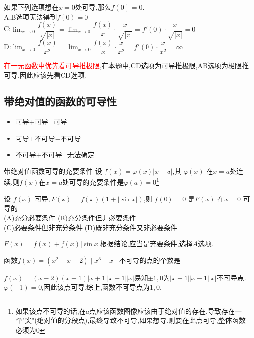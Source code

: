 \documentclass[8pt a4paper, oneside, UTF8]{ctexbook}  %
\begin{document}
\begin{sloppypar}
\begin{solution}
        如果下列选项想在$x=0$处可导,那么$f(0)=0$.\\
        A,B选项无法得到$f(0)=0$\\
        C:$\lim_{x\to 0}\dfrac{f(x)}{\sqrt{|x|}}=\lim_{x\to 0} \dfrac{f(x)}{x}\cdot \dfrac{x}{\sqrt{|x|}}=f'(0)\cdot \dfrac{x}{\sqrt{|x|}}=0$\\
        D:$\lim_{x\to 0}\dfrac{f(x)}{x^2}=\lim_{x\to 0} \dfrac{f(x)}{x}\cdot \dfrac{x}{x^2}=f'(0)\cdot \dfrac{x}{x^2}=\infty$
    \end{solution}
    \begin{note}    
        \textcolor{red}{在一元函数中优先看可导推极限},在本题中,CD选项为可导推极限,AB选项为极限推可导.因此应该先看CD选项.
    \end{note}
    \subsection{带绝对值的函数的可导性}
    \begin{itemize}
        \item 可导+可导=可导
        \item 可导+不可导=不可导
        \item 不可导+不可导=无法确定
    \end{itemize}
    \begin{conclusion}{带绝对值函数可导的充要条件}{}
        设 $f(x)=\varphi(x)\left|x-a\right|$,其 $\varphi(x)$ 在$x=a$处连续,则$f\left(x\right)$在$x=a$处可导的充要条件是$\varphi\left(a\right)=0$\footnote{如果该点不可导的话,在$a$点应该函数图像应该由于绝对值的存在,导致存在一个"尖"(绝对值的分段点),最终导致不可导,如果想导,则要在此点可导,整体函数必须为0}
    \end{conclusion}
    \begin{problem}
    设 $f(x)$ 可导$,F(x)=f(x)(1+|\sin x|)$,则 $f(0)=0$ 是$F(x)$ 在$x=0$ 可导的\\
    (A)充分必要条件 \quad (B)充分条件但非必要条件\\
    (C)必要条件但非充分条件 \quad (D)既非充分条件又非必要条件        
    \end{problem}
    \begin{solution}
        $F(x)=f(x)+f(x)|\sin x|$根据结论,应当是充要条件,选择$A$选项.
    \end{solution}
    \begin{problem}
        函数$f(x)=(x^2-x-2)\mid x^3-x\mid$不可导的点的个数是
    \end{problem}
    \begin{solution}
        $f(x)=(x-2)(x+1)|x+1||x-1||x|$易知$\pm 1,0$为$|x+1||x-1||x|$不可导点.$\varphi(-1) = 0$,因此该点可导.综上,函数不可导点为$1,0$.

\end{solution}
\end{sloppypar}
\end{document}
